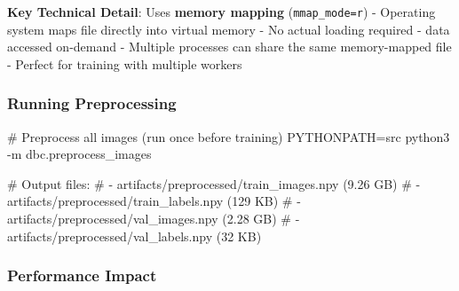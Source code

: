 \documentclass[
  letterpaper,
  DIV=11,
  numbers=noendperiod]{scrartcl}
\newenvironment{Shaded}{\begin{snugshade}}{\end{snugshade}}
\newcommand{\AttributeTok}[1]{\textcolor[rgb]{0.40,0.45,0.13}{#1}}
\newcommand{\CommentTok}[1]{\textcolor[rgb]{0.37,0.37,0.37}{#1}}
\newcommand{\ExtensionTok}[1]{\textcolor[rgb]{0.00,0.23,0.31}{#1}}
\newcommand{\NormalTok}[1]{\textcolor[rgb]{0.00,0.23,0.31}{#1}}
\newcommand{\OperatorTok}[1]{\textcolor[rgb]{0.37,0.37,0.37}{#1}}
\newcommand{\VariableTok}[1]{\textcolor[rgb]{0.07,0.07,0.07}{#1}}
\renewenvironment{Shaded}{%
  \begin{tcolorbox}[%
    enhanced,%
    colback=codebg,%
    colframe=codebg,%
    borderline west={3pt}{0pt}{sectionblue},%
    boxrule=0pt,%
    arc=0pt,%
    boxsep=5pt,%
    left=2mm,%
    right=2mm,%
    top=2mm,%
    bottom=2mm%
  ]%
}{%
  \end{tcolorbox}%
}
\begin{document}
\textbf{Key Technical Detail}: Uses \textbf{memory mapping}
(\texttt{mmap\_mode=\textquotesingle{}r\textquotesingle{}}) - Operating
system maps file directly into virtual memory - No actual loading
required - data accessed on-demand - Multiple processes can share the
same memory-mapped file - Perfect for training with multiple workers

\subsubsection{Running Preprocessing}\label{running-preprocessing}

\begin{Shaded}
\begin{Highlighting}[]
\CommentTok{\# Preprocess all images (run once before training)}
\VariableTok{PYTHONPATH}\OperatorTok{=}\NormalTok{src }\ExtensionTok{python3} \AttributeTok{{-}m}\NormalTok{ dbc.preprocess\_images}

\CommentTok{\# Output files:}
\CommentTok{\# {-} artifacts/preprocessed/train\_images.npy (9.26 GB)}
\CommentTok{\# {-} artifacts/preprocessed/train\_labels.npy (129 KB)}
\CommentTok{\# {-} artifacts/preprocessed/val\_images.npy (2.28 GB)}
\CommentTok{\# {-} artifacts/preprocessed/val\_labels.npy (32 KB)}
\end{Highlighting}
\end{Shaded}

\subsubsection{Performance Impact}\label{performance-impact}
\end{document}
